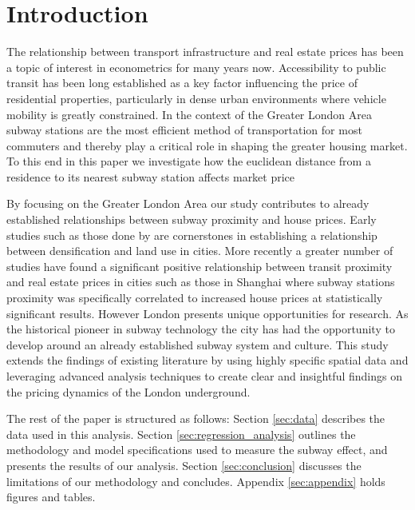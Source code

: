 \section{Introduction}
The relationship between transport infrastructure and real estate prices has been a topic of interest in econometrics for many years now. Accessibility to public transit has been long established as a key factor influencing the price of residential properties, particularly in dense urban environments where vehicle mobility is greatly constrained.
 In the context of the Greater London Area subway stations are the most efficient method of transportation for most commuters and thereby play a critical role in shaping the greater housing market.
  To this end in this paper we investigate how the euclidean distance from a residence to its nearest subway station affects market price 

By focusing on the Greater London Area our study contributes to already established relationships between subway proximity and house prices. 
Early studies such as those done by \citet{muth_1969} are cornerstones in establishing a relationship between densification and land use in cities. 
More recently a greater number of studies have found a significant positive relationship between transit proximity and real estate prices 
in cities such as those in Shanghai \citep{zhou_2019} where subway stations proximity was specifically correlated to 
increased house prices at statistically significant results. 
However London presents unique opportunities for research. 
As the historical pioneer in subway technology the city has had 
the opportunity to develop around an already established subway system and culture. 
This study extends the findings of existing literature by using highly specific spatial data and 
leveraging advanced analysis techniques to create clear and insightful findings on the pricing dynamics of the London underground.


The rest of the paper is structured as follows: Section \ref{sec:data} describes the data used in this analysis.
Section \ref{sec:regression_analysis} outlines the methodology and model specifications used to measure the subway effect,
 and presents the results of our analysis. Section \ref{sec:conclusion} discusses the limitations of our methodology and concludes.
  Appendix \ref{sec:appendix} holds figures and tables.
